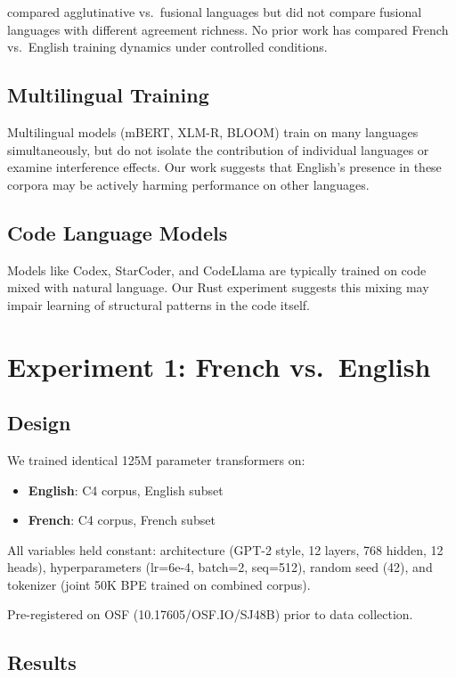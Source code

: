 \documentclass[11pt,a4paper]{article}
\begin{document}
\cite{arnett2024morphology} compared agglutinative vs.\ fusional languages but did not compare fusional languages with different agreement richness. No prior work has compared French vs.\ English training dynamics under controlled conditions.

\subsection{Multilingual Training}

Multilingual models (mBERT, XLM-R, BLOOM) train on many languages simultaneously, but do not isolate the contribution of individual languages or examine interference effects. Our work suggests that English's presence in these corpora may be actively harming performance on other languages.

\subsection{Code Language Models}

Models like Codex, StarCoder, and CodeLlama are typically trained on code mixed with natural language. Our Rust experiment suggests this mixing may impair learning of structural patterns in the code itself.

\section{Experiment 1: French vs.\ English}

\subsection{Design}

We trained identical 125M parameter transformers on:
\begin{itemize}
    \item \textbf{English}: C4 corpus, English subset
    \item \textbf{French}: C4 corpus, French subset
\end{itemize}

All variables held constant: architecture (GPT-2 style, 12 layers, 768 hidden, 12 heads), hyperparameters (lr=6e-4, batch=2, seq=512), random seed (42), and tokenizer (joint 50K BPE trained on combined corpus).

Pre-registered on OSF (10.17605/OSF.IO/SJ48B) prior to data collection.

\subsection{Results}
\end{document}

